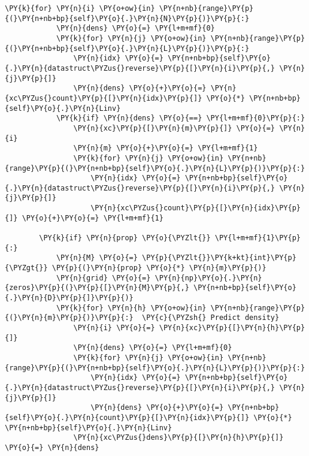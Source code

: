 \begin{Verbatim}[commandchars=\\\{\}]
        \PY{k}{for} \PY{n}{i} \PY{o+ow}{in} \PY{n+nb}{range}\PY{p}{(}\PY{n+nb+bp}{self}\PY{o}{.}\PY{n}{N}\PY{p}{)}\PY{p}{:}
            \PY{n}{dens} \PY{o}{=} \PY{l+m+mf}{0}
            \PY{k}{for} \PY{n}{j} \PY{o+ow}{in} \PY{n+nb}{range}\PY{p}{(}\PY{n+nb+bp}{self}\PY{o}{.}\PY{n}{L}\PY{p}{)}\PY{p}{:}
                \PY{n}{idx} \PY{o}{=} \PY{n+nb+bp}{self}\PY{o}{.}\PY{n}{datastruct\PYZus{}reverse}\PY{p}{[}\PY{n}{i}\PY{p}{,} \PY{n}{j}\PY{p}{]}
                \PY{n}{dens} \PY{o}{+}\PY{o}{=} \PY{n}{xc\PYZus{}count}\PY{p}{[}\PY{n}{idx}\PY{p}{]} \PY{o}{*} \PY{n+nb+bp}{self}\PY{o}{.}\PY{n}{Linv}
            \PY{k}{if} \PY{n}{dens} \PY{o}{==} \PY{l+m+mf}{0}\PY{p}{:}
                \PY{n}{xc}\PY{p}{[}\PY{n}{m}\PY{p}{]} \PY{o}{=} \PY{n}{i}
                \PY{n}{m} \PY{o}{+}\PY{o}{=} \PY{l+m+mf}{1}
                \PY{k}{for} \PY{n}{j} \PY{o+ow}{in} \PY{n+nb}{range}\PY{p}{(}\PY{n+nb+bp}{self}\PY{o}{.}\PY{n}{L}\PY{p}{)}\PY{p}{:}
                    \PY{n}{idx} \PY{o}{=} \PY{n+nb+bp}{self}\PY{o}{.}\PY{n}{datastruct\PYZus{}reverse}\PY{p}{[}\PY{n}{i}\PY{p}{,} \PY{n}{j}\PY{p}{]} 
                    \PY{n}{xc\PYZus{}count}\PY{p}{[}\PY{n}{idx}\PY{p}{]} \PY{o}{+}\PY{o}{=} \PY{l+m+mf}{1}
        
        \PY{k}{if} \PY{n}{prop} \PY{o}{\PYZlt{}} \PY{l+m+mf}{1}\PY{p}{:}           
            \PY{n}{M} \PY{o}{=} \PY{p}{\PYZlt{}}\PY{k+kt}{int}\PY{p}{\PYZgt{}} \PY{p}{(}\PY{n}{prop} \PY{o}{*} \PY{n}{m}\PY{p}{)}
            \PY{n}{grid} \PY{o}{=} \PY{n}{np}\PY{o}{.}\PY{n}{zeros}\PY{p}{(}\PY{p}{[}\PY{n}{M}\PY{p}{,} \PY{n+nb+bp}{self}\PY{o}{.}\PY{n}{D}\PY{p}{]}\PY{p}{)}
            \PY{k}{for} \PY{n}{h} \PY{o+ow}{in} \PY{n+nb}{range}\PY{p}{(}\PY{n}{m}\PY{p}{)}\PY{p}{:}  \PY{c}{\PYZsh{} Predict density}
                \PY{n}{i} \PY{o}{=} \PY{n}{xc}\PY{p}{[}\PY{n}{h}\PY{p}{]}
                \PY{n}{dens} \PY{o}{=} \PY{l+m+mf}{0}
                \PY{k}{for} \PY{n}{j} \PY{o+ow}{in} \PY{n+nb}{range}\PY{p}{(}\PY{n+nb+bp}{self}\PY{o}{.}\PY{n}{L}\PY{p}{)}\PY{p}{:}
                    \PY{n}{idx} \PY{o}{=} \PY{n+nb+bp}{self}\PY{o}{.}\PY{n}{datastruct\PYZus{}reverse}\PY{p}{[}\PY{n}{i}\PY{p}{,} \PY{n}{j}\PY{p}{]}
                    \PY{n}{dens} \PY{o}{+}\PY{o}{=} \PY{n+nb+bp}{self}\PY{o}{.}\PY{n}{count}\PY{p}{[}\PY{n}{idx}\PY{p}{]} \PY{o}{*} \PY{n+nb+bp}{self}\PY{o}{.}\PY{n}{Linv}
                \PY{n}{xc\PYZus{}dens}\PY{p}{[}\PY{n}{h}\PY{p}{]} \PY{o}{=} \PY{n}{dens}


\end{Verbatim}
